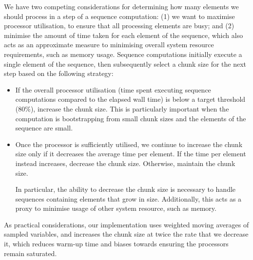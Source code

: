 We have two competing considerations for determining how many elements we should
process in a step of a sequence computation: (1) we want to maximise processor
utilisation, to ensure that all processing elements are busy; and (2) minimise
the amount of time taken for each element of the sequence, which also acts as an
approximate measure to minimising overall system resource requirements, such as
memory usage. Sequence computations initially execute a single element of the
sequence, then subsequently select a chunk size for the next step based on the
following strategy:
%
\begin{itemize}
  \item If the overall processor utilisation (time spent executing sequence
    computations compared to the elapsed wall time) is below a target threshold
    (80\%), increase the chunk size.
    This is particularly important when the computation is bootstrapping from
    small chunk sizes and the elements of the sequence are small.

  \item Once the processor is sufficiently utilised, we continue to increase the
    chunk size only if it decreases the average time per element. If the time
    per element instead increases, decrease the chunk size. Otherwise, maintain
    the chunk size.

    In particular, the ability to decrease the chunk size is
    necessary to handle sequences containing elements that grow in size.
    Additionally, this acts as a proxy to minimise usage of other system
    resource, such as memory.


\end{itemize}
%
As practical considerations, our implementation uses weighted moving averages of
sampled variables, and increases the chunk size at twice the rate that we
decrease it, which reduces warm-up time and biases towards ensuring the
processors remain saturated.

\endinput



